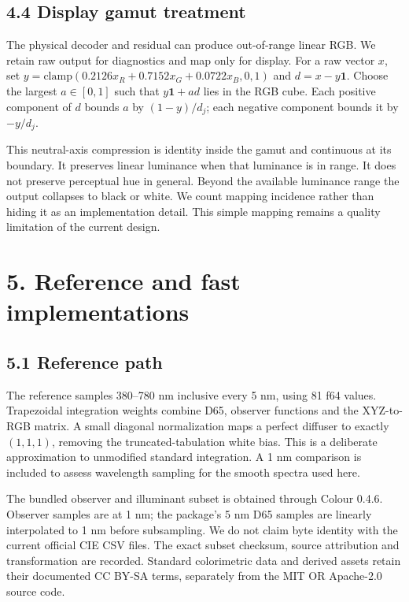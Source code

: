 \documentclass[
  10pt,
  twocolumn]{article}
\begin{document}
\hypertarget{display-gamut-treatment}{%
\subsection{4.4 Display gamut treatment}\label{display-gamut-treatment}}

The physical decoder and residual can produce out-of-range linear RGB.
We retain raw output for diagnostics and map only for display. For a raw
vector \(x\), set
\(y=\mathrm{clamp}(0.2126x_R+0.7152x_G+0.0722x_B,0,1)\) and
\(d=x-y\mathbf1\). Choose the largest \(a\in[0,1]\) such that
\(y\mathbf1+ad\) lies in the RGB cube. Each positive component of \(d\)
bounds \(a\) by \((1-y)/d_j\); each negative component bounds it by
\(-y/d_j\).

This neutral-axis compression is identity inside the gamut and
continuous at its boundary. It preserves linear luminance when that
luminance is in range. It does not preserve perceptual hue in general.
Beyond the available luminance range the output collapses to black or
white. We count mapping incidence rather than hiding it as an
implementation detail. This simple mapping remains a quality limitation
of the current design.

\hypertarget{reference-and-fast-implementations}{%
\section{5. Reference and fast
implementations}\label{reference-and-fast-implementations}}

\hypertarget{reference-path}{%
\subsection{5.1 Reference path}\label{reference-path}}

The reference samples 380--780 nm inclusive every 5 nm, using 81 f64
values. Trapezoidal integration weights combine D65, observer functions
and the XYZ-to-RGB matrix. A small diagonal normalization maps a perfect
diffuser to exactly \((1,1,1)\), removing the truncated-tabulation white
bias. This is a deliberate approximation to unmodified standard
integration. A 1 nm comparison is included to assess wavelength sampling
for the smooth spectra used here.

The bundled observer and illuminant subset is obtained through Colour
0.4.6. Observer samples are at 1 nm; the package's 5 nm D65 samples are
linearly interpolated to 1 nm before subsampling. We do not claim byte
identity with the current official CIE CSV files. The exact subset
checksum, source attribution and transformation are recorded. Standard
colorimetric data and derived assets retain their documented CC BY-SA
terms, separately from the MIT OR Apache-2.0 source code.
\end{document}
